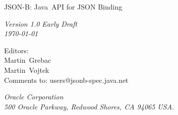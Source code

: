 \begin{titlepage}
\raggedleft

\vspace*{60pt}

{\Huge
\textsf{JSON-B: Java\texttrademark\ API for JSON Binding}}

\vspace{20pt}

{
\Large\textit{Version 1.0 Early Draft\\
\today}\\
}

\vspace{40pt}

{\large Editors:\\
Martin\ Grebac\\
Martin\ Vojtek\\
\vspace{10pt}Comments to: users@jsonb-spec.java.net
}

\vspace{80pt}

{\small\textit{Oracle Corporation\\
500 Oracle Parkway, Redwood Shores, CA 94065 USA.}
}
\end{titlepage} 
